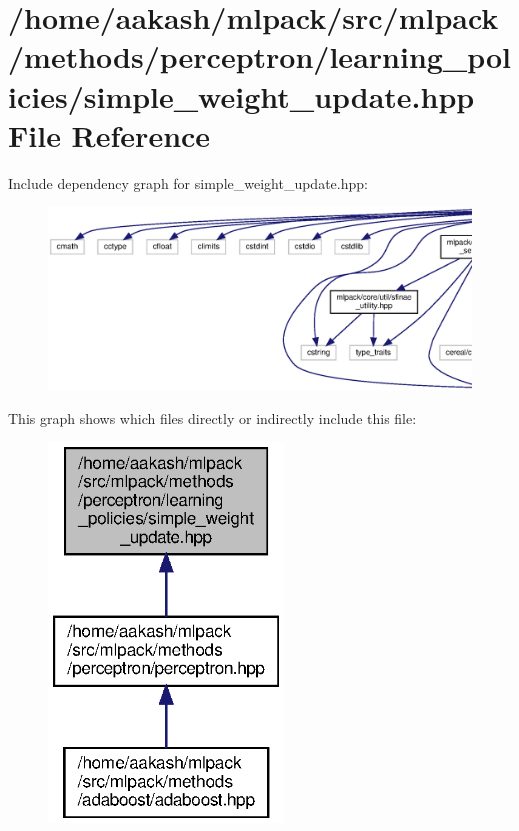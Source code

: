 \section{/home/aakash/mlpack/src/mlpack/methods/perceptron/learning\+\_\+policies/simple\+\_\+weight\+\_\+update.hpp File Reference}
\label{simple__weight__update_8hpp}
Include dependency graph for simple\+\_\+weight\+\_\+update.\+hpp\+:
\nopagebreak
\begin{figure}[H]
\begin{center}
\leavevmode
\includegraphics[width=350pt]{simple__weight__update_8hpp__incl}
\end{center}
\end{figure}
This graph shows which files directly or indirectly include this file\+:
\nopagebreak
\begin{figure}[H]
\begin{center}
\leavevmode
\includegraphics[width=177pt]{simple__weight__update_8hpp__dep__incl}
\end{center}
\end{figure}
